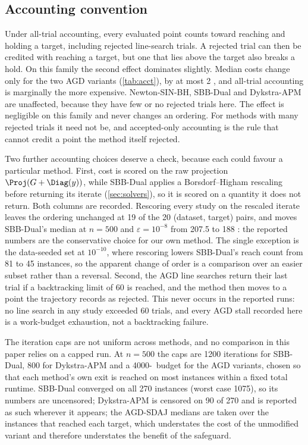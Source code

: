 \subsection{Accounting convention}\label{sec:acct-results}
Under all-trial accounting, every evaluated point counts toward reaching and
holding a target, including rejected line-search trials. A rejected trial can
then be credited with reaching a target, but one that lies above the target
also breaks a hold. On this family the second effect dominates slightly.
Median costs change only for the two AGD variants (\cref{tab:acct}), by at
most 2 \EVDs, and all-trial accounting is marginally the more expensive.
Newton-SIN-BH, SBB-Dual and Dykstra-APM are unaffected, because they have few
or no rejected trials here. The effect is negligible on this family and never
changes an ordering. For methods with many rejected trials it need not be,
and accepted-only accounting is the rule that cannot credit a point the method
itself rejected.

Two further accounting choices deserve a check, because each could favour a
particular method. First, cost is scored on the raw projection
$\Proj(G+\Diag(y))$, while SBB-Dual applies a Borsdorf--Higham rescaling before
returning its iterate (\cref{sec:solvers}), so it is scored on a quantity it
does not return. Both columns are recorded. Rescoring every study on the
rescaled iterate leaves the ordering unchanged at 19 of the 20
(dataset, target) pairs, and moves SBB-Dual's median at $n=500$ and
$\varepsilon=10^{-8}$ from 207.5 to 188 \EVDs: the reported numbers are the
conservative choice for our own method. The single exception is the
data-seeded set at $10^{-10}$, where rescoring lowers SBB-Dual's reach count
from 81 to 45 instances, so the apparent change of order is a comparison over
an easier subset rather than a reversal. Second, the AGD line searches return
their last trial if a backtracking limit of 60 is reached, and the method then
moves to a point the trajectory records as rejected. This never occurs in the
reported runs: no line search in any study exceeded 60 trials, and every
AGD stall recorded here is a work-budget exhaustion, not a backtracking
failure.

The iteration caps are not uniform across methods, and no comparison in this
paper relies on a capped run. At $n=500$ the caps are 1200 iterations for
SBB-Dual, 800 for Dykstra-APM and a 4000-\EVD\ budget for the AGD variants,
chosen so that each method's own exit is reached on most instances within a
fixed total runtime. SBB-Dual converged on all 270 instances (worst case
1075), so its numbers are uncensored; Dykstra-APM is censored on 90 of 270 and
is reported as such wherever it appears; the AGD-SDAJ medians are taken over
the instances that reached each target, which understates the cost of the
unmodified variant and therefore understates the benefit of the safeguard.

